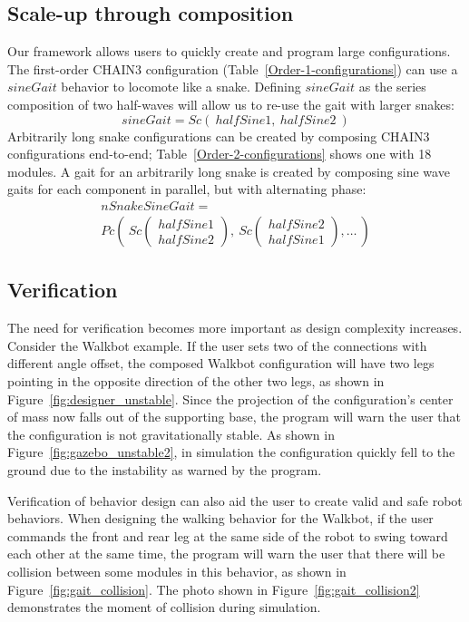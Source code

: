 \documentclass[conference]{IEEEtran}
\theoremstyle{definition}
\begin{document}
\subsection{Scale-up through composition}
Our framework allows users to quickly create and program large configurations. The
first-order CHAIN3 configuration (Table~\ref{Order-1-configurations}) can use a \(sineGait\)
behavior to locomote like a snake. Defining \(sineGait\)  as the series composition
of two half-waves will allow us to re-use the gait with larger snakes:
\begin{displaymath}
sineGait = Sc(~halfSine1,~halfSine2~)
\end{displaymath}
Arbitrarily long snake configurations can be created
by composing CHAIN3 configurations end-to-end; Table~\ref{Order-2-configurations} shows one with 18 modules.
A gait for an arbitrarily long snake is created by composing sine wave
gaits for each component in parallel, but with alternating phase:
\begin{align*}
nSnakeSineGait = ~~~~~~~~~~~~~~~~~~~~~~~~~~~~~~~~~~~~~~~~~~\\
Pc \left(~Sc\begin{pmatrix} halfSine1 \\ halfSine2 \end{pmatrix},
~Sc\begin{pmatrix} halfSine2 \\ halfSine1 \end{pmatrix},\ldots ~\right)
\end{align*}


\subsection{Verification}
The need for verification becomes more important as design complexity increases. Consider the Walkbot example. If the user sets two of the connections with different angle offset, the composed Walkbot configuration will have two legs pointing in the opposite direction of the other two legs, as shown in Figure~\ref{fig:designer_unstable}. Since the projection of the configuration's center of mass now falls out of the supporting base, the program will warn the user that the configuration is not gravitationally stable. As shown in Figure~\ref{fig:gazebo_unstable2}, in simulation the configuration quickly fell to the ground due to the instability as warned by the program. 

Verification of behavior design can also aid the user to create valid and safe robot behaviors. When designing the walking behavior for the Walkbot, if the user commands the front and rear leg at the same side of the robot to swing toward each other at the same time, the program will warn the user that there will be collision between some modules in this behavior, as shown in Figure~\ref{fig:gait_collision}. The photo shown in Figure~\ref{fig:gait_collision2} demonstrates the moment of collision during simulation.
 
\end{document}

